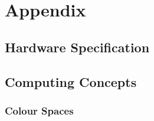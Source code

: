 \chapter{Appendix}

\section{Hardware Specification}\label{ref:app:hwspec}



\section{Computing Concepts}

\subsection{Colour Spaces}\label{ref:app:colour}

